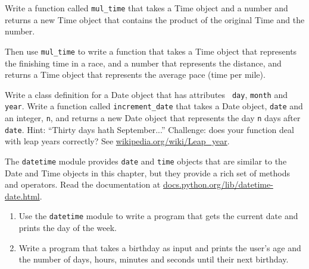 \documentclass[10pt]{book}
\begin{document}
\begin{ex}
Write a function called \verb"mul_time" that takes a Time object
and a number and returns a new Time object that contains
the product of the original Time and the number.

Then use \verb"mul_time" to write a function that takes a Time
object that represents the finishing time in a race, and a number
that represents the distance, and returns a Time object that represents
the average pace (time per mile).


\end{ex}

\begin{ex}


Write a class definition for a Date object that has attributes {\tt
  day}, {\tt month} and {\tt year}.  Write a function called
\verb"increment_date" that takes a Date object, {\tt date} and an
integer, {\tt n}, and returns a new Date object that
represents the day {\tt n} days after {\tt date}.  Hint:
``Thirty days hath September...''  Challenge: does your function
deal with leap years correctly?  See \url{wikipedia.org/wiki/Leap_year}.

\end{ex}


\begin{ex}


The {\tt datetime} module provides {\tt date} and {\tt time} objects
that are similar to the Date and Time objects in this chapter, but
they provide a rich set of methods and operators.  Read the
documentation at \url{docs.python.org/lib/datetime-date.html}.

\begin{enumerate}

\item Use the {\tt datetime} module to write a program that
gets the current date and prints the day of the week.


\item Write a program that takes a birthday as input
and prints the user's age and the number of days, hours,
minutes and seconds until their next birthday.
\end{enumerate}

\end{ex}
\end{document}
